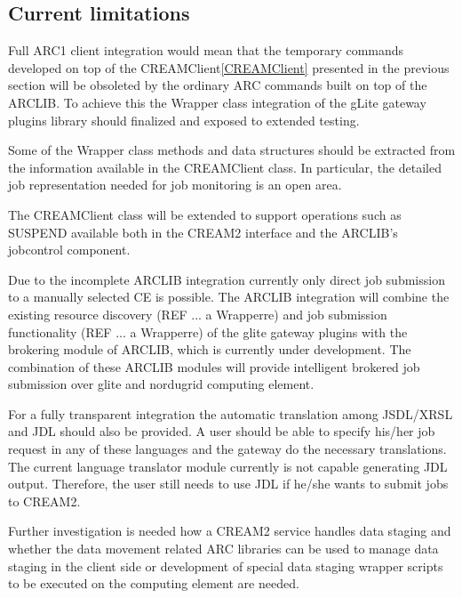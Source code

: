 \documentclass{article}
\begin{document}
\subsection{Current limitations}
Full ARC1 client integration would mean that the temporary commands developed on top of the CREAMClient\ref{CREAMClient} presented in the previous section will be obsoleted by the ordinary ARC commands built on top of the ARCLIB. To achieve this the Wrapper class integration of the gLite gateway plugins library should finalized and exposed to extended testing.\par
Some of the Wrapper class methods and data structures should be extracted from the information available in the CREAMClient class. In particular, the detailed job representation needed for job monitoring is an open area.\par
The CREAMClient class will be extended to support operations such as SUSPEND available both in the CREAM2 interface and the ARCLIB's jobcontrol component.\par
Due to the incomplete ARCLIB integration currently only direct job submission to a manually selected CE is possible. The ARCLIB integration will combine the existing resource discovery (REF ... a Wrapperre) and job submission functionality (REF ... a Wrapperre)  of the glite gateway plugins with the brokering module of ARCLIB, which is  currently under development. The combination of these ARCLIB modules will provide intelligent brokered job submission over glite and nordugrid computing element.\par
For a fully transparent integration the automatic translation among JSDL/XRSL and JDL should also be provided. A user should be able to specify his/her job request in any of these languages and the gateway do the necessary translations.  The current language translator module currently is not capable generating JDL output.  Therefore, the user still needs to use JDL if he/she wants to submit jobs to CREAM2.\par
Further investigation is needed how a CREAM2 service handles data staging and whether the data movement related ARC libraries can be used to manage data staging in the client side or development of special data staging wrapper scripts to be executed on the computing element are needed.
\end{document}
